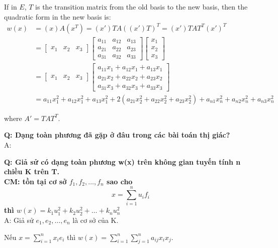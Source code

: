 If in $E$, $T$ is the transition matrix from the old basis to the new basis, then the quadratic form in the new basis is:
\begin{align*}
    w(x) &= (x)A(x^T) = (x')T A ((x')T)^T = (x')T AT^T (x')^T\\
    &= \begin{bmatrix}
        x_1 & x_2 & x_3
    \end{bmatrix}
    \begin{bmatrix}
        a_{11} & a_{12} & a_{13}\\
        a_{21} & a_{22} & a_{23}\\
        a_{31} & a_{32} & a_{33}
    \end{bmatrix}
    \begin{bmatrix}
        x_1\\
        x_2\\
        x_3
    \end{bmatrix}\\
    &=\begin{bmatrix}
        x_1 & x_2 & x_3
    \end{bmatrix}
    \begin{bmatrix}
        a_{11}x_1 + a_{12}x_1 + a_{13}x_1\\
        a_{21}x_2 + a_{22}x_2 + a_{23}x_2\\
        a_{31}x_3 + a_{32}x_3 + a_{33}x_3
    \end{bmatrix}\\
    &= a_{11}x_1^2 + a_{12}x_1^2 + a_{13}x_1^2 + 2(a_{21}x_2^2 + a_{22}x_2^2 + a_{23}x_2^2) + a_{n1}x_n^2 + a_{n2}x_n^2 + a_{n3}x_n^2
\end{align*}

where $A' = T A T^T$.

\textbf{Q: Dạng toàn phương đã gặp ở đâu trong các bài toán thị giác?}\\
A: 

\textbf{Q: Giả sử có dạng toàn phương w(x) trên không gian tuyến tính n  chiều K trên T.\\
CM: tồn tại cơ sở $f_1, f_2, \ldots, f_n$ sao cho}
\begin{equation*}
    x = \sum_{i=1}^n u_i f_i
\end{equation*}
\textbf{thì $w(x) = k_1 u_1^2 + k_2 u_2^2 + \ldots + k_n u_n^2$}\\
A: Giả sử $e_1, e_2, \ldots, e_n$ là cơ sở của K.

Nếu $x = \sum_{i=1}^n x_i e_i$ thì $w(x) = \sum_{i=1}^n \sum_{j=1}^n a_{ij}x_ix_j$.

